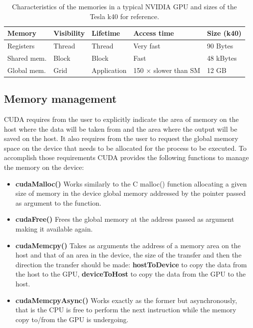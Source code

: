 \begin{center}
\begin{table}[h]
\begin{tabular}{ l | l | l | l | l}
\textbf{Memory} & \textbf{Visibility} & \textbf{Lifetime} & \textbf{Access time} & \textbf{Size (k40)}\\
\hline
Registers & Thread & Thread & Very fast & 90 Bytes \\
Shared mem. & Block & Block & Fast & 48 kBytes \\
Global mem. & Grid & Application & 150 $\times$ slower than SM & 12 GB \\
\end{tabular}
\caption{Characteristics of the memories in a typical NVIDIA GPU and sizes of the Tesla k40 for reference.}
\label{tabMemory}
\end{table}
\end{center}

\subsection{Memory management}
CUDA requires from the user to explicitly indicate the area of memory on the host where the data will be taken from and the area where the output will be saved on the host.
It also requires from the user to request the global memory space on the device that needs to be allocated for the process to be executed.
To accomplish those requirements CUDA provides the following functions to manage the memory on the device:
\begin{itemize}
\item \textbf{cudaMalloc()} Works similarly to the C malloc() function allocating a given size of memory in the device global memory addressed by the pointer passed as argument to the function.
\item \textbf{cudaFree()} Frees the global memory at the address passed as argument making it available again.
\item \textbf{cudaMemcpy()} Takes as arguments the address of a memory area on the host and that of an area in the device, the size of the transfer and then the direction the transfer should be made: \textbf{hostToDevice} to copy the data from the host to the GPU, \textbf{deviceToHost} to copy the data from the GPU to the host.
\item \textbf{cudaMemcpyAsync()} Works exactly as the former but asynchronously, that is the CPU is free to perform the next instruction while the memory copy to/from the GPU is undergoing.
\end{itemize}

